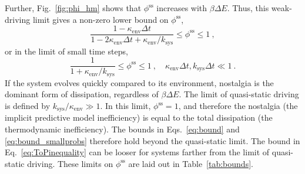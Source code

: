 \documentclass[entropy,article,
submit,
moreauthors,pdftex,10pt,a4paper]{mdpi}
\newcommand{\phiSS}{\phi^{\mathrm{ss}}}
\newcommand{\kenv}{\kappa_\mathrm{env}}
\newcommand{\ksys}{k_\mathrm{sys}}
\newcommand{\kstar}{\ksys/\kenv}
\begin{document}
Further, Fig.~\ref{fig:phi_hm} shows that $\phiSS$ increases with $\beta \Delta E$. 
Thus, this weak-driving limit gives a non-zero lower bound on $\phiSS$,
\begin{equation}
	\label{eq:bound}
	\frac{1-\kenv\Delta t}{1-2\kenv\Delta t+\kenv/\ksys} \le \phiSS \le 1 \ ,
\end{equation}
or in the limit of small time steps,
\begin{equation}
	\label{eq:bound_smallprobs}
	\frac{1}{1+\kenv/\ksys} \le \phiSS \le 1 \ , \quad 
    \kenv\Delta t, \ksys\Delta t\ll 1 \ .
\end{equation}
If the system evolves quickly compared to its environment, nostalgia is the dominant form of dissipation, regardless of $\beta \Delta E$. 
The limit of quasi-static driving is defined by $\kstar \gg 1$. In this limit, $\phiSS=1$, and therefore the nostalgia (the implicit predictive model inefficiency) is equal to the total dissipation (the thermodynamic inefficiency). The bounds in Eqs.~\eqref{eq:bound} and \eqref{eq:bound_smallprobs} therefore hold beyond the quasi-static limit. The bound in Eq.~\eqref{eq:ToPinequality} can be looser for systems farther from the limit of quasi-static driving. 
These limits on $\phiSS$ are laid out in Table~\ref{tab:bounds}.

\end{document}
